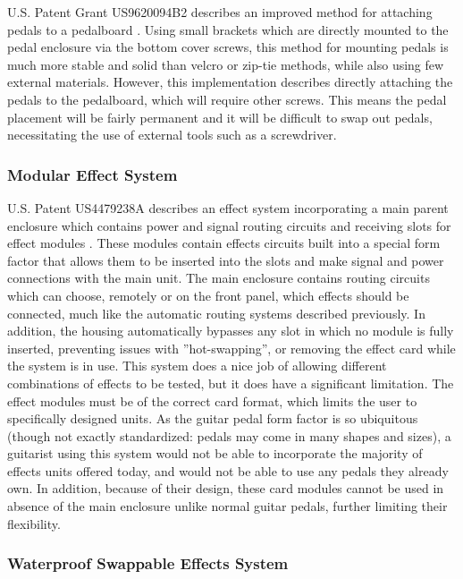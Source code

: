 \documentclass{article}
\begin{document}
		U.S. Patent Grant US9620094B2 describes an improved method for attaching pedals to a pedalboard \cite{ABBATE:2016}.  Using small brackets which are directly mounted to the pedal enclosure via the bottom cover screws, this method for mounting pedals is much more stable and solid than velcro or zip-tie methods, while also using few external materials. However, this implementation describes directly attaching the pedals to the pedalboard, which will require other screws. This means the pedal placement will be fairly permanent and it will be difficult to swap out pedals, necessitating the use of external tools such as a screwdriver.

		\subsubsection{Modular Effect System}

		U.S. Patent US4479238A describes an effect system incorporating a main parent enclosure which contains power and signal routing circuits and receiving slots for effect modules \cite{SPECTOR:1982}. These modules contain effects circuits built into a special form factor that allows them to be inserted into the slots and make signal and power connections with the main unit. The main enclosure contains routing circuits which can choose, remotely or on the front panel, which effects should be connected, much like the automatic routing systems described previously. In addition, the housing automatically bypasses any slot in which no module is fully inserted, preventing issues with ”hot-swapping”, or removing the effect card while the system is in use. This system does a nice job of allowing different combinations of effects to be tested, but it does have a significant limitation. The effect modules must be of the correct card format, which limits the user to specifically designed units. As the guitar pedal form factor is so ubiquitous (though not exactly standardized: pedals may come in many shapes and sizes), a guitarist using this system would not be able to incorporate the majority of effects units offered today, and would not be able to use any pedals they already own. In addition, because of their design, these card modules cannot be used in absence of the main enclosure unlike normal guitar pedals, further limiting their flexibility.

		\subsubsection{Waterproof Swappable Effects System}
\end{document}
